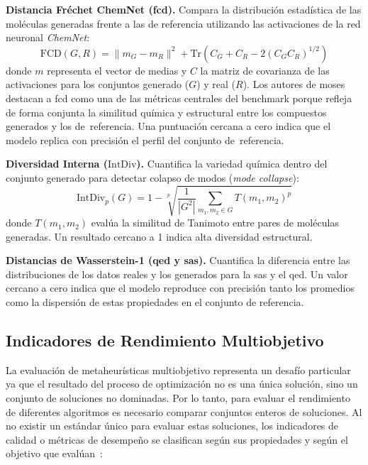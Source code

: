 \textbf{Distancia Fréchet ChemNet (\acrshort{fcd}).} Compara la distribución estadística de las moléculas generadas frente a las de referencia utilizando las activaciones de la red neuronal \textit{ChemNet}:
\begin{equation}
    \text{FCD}(G, R) = \|m_G - m_R\|^2 + \text{Tr} \left( C_G + C_R - 2(C_G C_R)^{1/2} \right)
\end{equation}
donde $m$ representa el vector de medias y $C$ la matriz de covarianza de las activaciones para los conjuntos generado ($G$) y real ($R$). Los autores de \gls{moses} destacan a \acrshort{fcd} como una de las métricas centrales del benchmark porque refleja de forma conjunta la similitud química y estructural entre los compuestos generados y los de~referencia. Una puntuación cercana a cero indica que el modelo replica con precisión el perfil del conjunto de~referencia.

\textbf{Diversidad Interna ($\text{IntDiv}$).} Cuantifica la variedad química dentro del conjunto generado para detectar colapso de modos (\textit{mode collapse}):
\begin{equation}
    \text{IntDiv}_p(G) = 1 - \sqrt[p]{\frac{1}{|G^2|} \sum_{m_1, m_2 \in G} T(m_1, m_2)^p}
\end{equation}
donde $T(m_1, m_2)$ evalúa la similitud de Tanimoto entre pares de moléculas generadas. Un resultado cercano a 1 indica alta diversidad estructural.

\textbf{Distancias de Wasserstein-1 (\gls{qed} y \gls{sas}).} Cuantifica la diferencia entre las distribuciones de los datos reales y los generados para la \gls{sas} y el \gls{qed}. Un valor cercano a cero indica que el modelo reproduce con precisión tanto los promedios como la dispersión de estas propiedades en el conjunto de referencia.

\subsection{Indicadores de Rendimiento Multiobjetivo}
\label{subsec:indicadores_multiobjetivo}
\label{sec:indicadores_multiobjetivo}

La evaluación de metaheurísticas multiobjetivo representa un desafío particular ya que el resultado del proceso de optimización no es una única solución, sino un conjunto de soluciones no dominadas. Por lo tanto, para evaluar el rendimiento de diferentes algoritmos es necesario comparar conjuntos enteros de soluciones. Al no existir un estándar único para evaluar estas soluciones, los indicadores de calidad o métricas de desempeño se clasifican según sus propiedades y según el objetivo que evalúan~\cite{talbi2009metaheuristics}:

